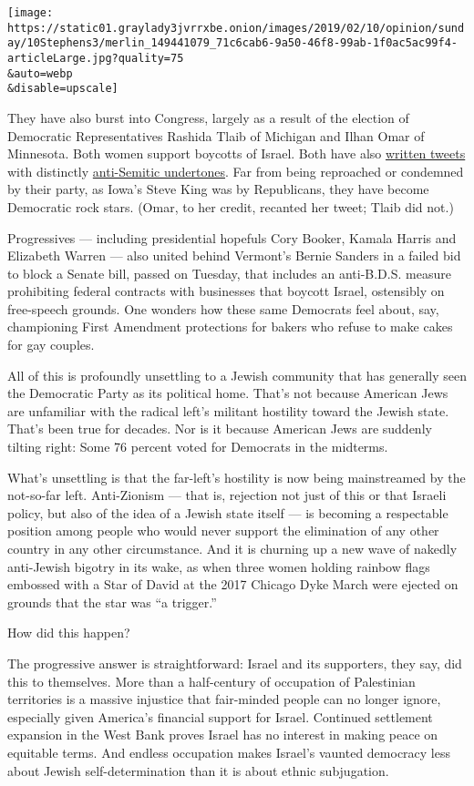 \texttt{[image: https://static01.graylady3jvrrxbe.onion/images/2019/02/10/opinion/sunday/10Stephens3/merlin\_149441079\_71c6cab6-9a50-46f8-99ab-1f0ac5ac99f4-articleLarge.jpg?quality=75\\\&auto=webp\\\&disable=upscale]}

They have also burst into Congress, largely as a result of the election
of Democratic Representatives Rashida Tlaib of Michigan and Ilhan Omar
of Minnesota. Both women support boycotts of Israel. Both have also
\href{https://twitter.com/rashidatlaib/status/1082095303325609984?lang=en}{written
tweets} with distinctly
\href{https://twitter.com/ilhanmn/status/269488770066313216?lang=en}{anti-Semitic
undertones}. Far from being reproached or condemned by their party, as
Iowa's Steve King was by Republicans, they have become Democratic rock
stars. (Omar, to her credit, recanted her tweet; Tlaib did not.)

Progressives --- including presidential hopefuls Cory Booker, Kamala
Harris and Elizabeth Warren --- also united behind Vermont's Bernie
Sanders in a failed bid to block a Senate bill, passed on Tuesday, that
includes an anti-B.D.S. measure prohibiting federal contracts with
businesses that boycott Israel, ostensibly on free-speech grounds. One
wonders how these same Democrats feel about, say, championing First
Amendment protections for bakers who refuse to make cakes for gay
couples.

All of this is profoundly unsettling to a Jewish community that has
generally seen the Democratic Party as its political home. That's not
because American Jews are unfamiliar with the radical left's militant
hostility toward the Jewish state. That's been true for decades. Nor is
it because American Jews are suddenly tilting right: Some 76 percent
voted for Democrats in the midterms.

What's unsettling is that the far-left's hostility is now being
mainstreamed by the not-so-far left. Anti-Zionism --- that is, rejection
not just of this or that Israeli policy, but also of the idea of a
Jewish state itself --- is becoming a respectable position among people
who would never support the elimination of any other country in any
other circumstance. And it is churning up a new wave of nakedly
anti-Jewish bigotry in its wake, as when three women holding rainbow
flags embossed with a Star of David at the 2017 Chicago Dyke March were
ejected on grounds that the star was ``a trigger.''

How did this happen?

The progressive answer is straightforward: Israel and its supporters,
they say, did this to themselves. More than a half-century of occupation
of Palestinian territories is a massive injustice that fair-minded
people can no longer ignore, especially given America's financial
support for Israel. Continued settlement expansion in the West Bank
proves Israel has no interest in making peace on equitable terms. And
endless occupation makes Israel's vaunted democracy less about Jewish
self-determination than it is about ethnic subjugation.

